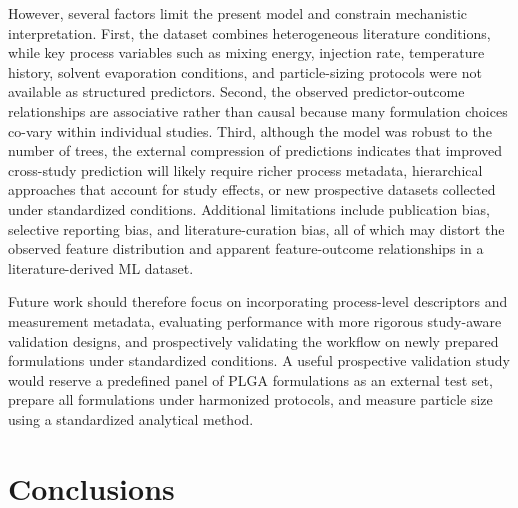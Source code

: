 \documentclass[10pt]{NSP1}
\begin{document}
However, several factors limit the present model and constrain mechanistic interpretation. First,
the dataset combines heterogeneous literature conditions, while key process variables such as
mixing energy, injection rate, temperature history, solvent evaporation conditions, and
particle-sizing protocols were not available as structured predictors. Second, the observed
predictor-outcome relationships are associative rather than causal because many formulation choices
co-vary within individual studies. Third, although the model was robust to the number of trees,
the external compression of predictions indicates that improved cross-study prediction will likely
require richer process metadata, hierarchical approaches that account for study effects, or new
prospective datasets collected under standardized conditions. Additional limitations include
publication bias, selective reporting bias, and literature-curation bias, all of which may distort
the observed feature distribution and apparent feature-outcome relationships in a
literature-derived ML dataset.

Future work should therefore focus on incorporating process-level descriptors and measurement
metadata, evaluating performance with more rigorous study-aware validation designs, and
prospectively validating the workflow on newly prepared formulations under standardized conditions.
A useful prospective validation study would reserve a predefined panel of PLGA formulations as an
external test set, prepare all formulations under harmonized protocols, and measure particle size
using a standardized analytical method.

\section{Conclusions}
\end{document}
